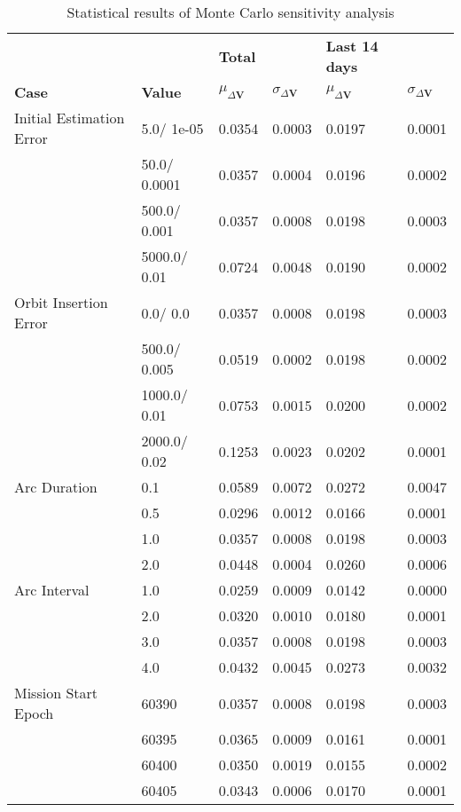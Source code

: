 \begin{table}[h!]
\centering
\begin{tabular}{llllll}
 &  & \cellcolor[HTML]{EFEFEF}\textbf{Total} &  & \cellcolor[HTML]{EFEFEF}\textbf{Last 14 days} &  \\
\rowcolor[HTML]{EFEFEF} 
\textbf{Case} & \textbf{Value} & \textbf{$\mu_{\Delta \boldsymbol{V}}$} & \textbf{$\sigma_{\Delta \boldsymbol{V}}$} & \textbf{$\mu_{\Delta \boldsymbol{V}}$} & \textbf{$\sigma_{\Delta \boldsymbol{V}}$} \\ 
Initial Estimation Error & 5.0/
1e-05 & 0.0354 & 0.0003 & 0.0197 & 0.0001 \\ 
 & 50.0/
0.0001 & 0.0357 & 0.0004 & 0.0196 & 0.0002 \\ 
 & 500.0/
0.001 & 0.0357 & 0.0008 & 0.0198 & 0.0003 \\ 
 & 5000.0/
0.01 & 0.0724 & 0.0048 & 0.0190 & 0.0002 \\ 
Orbit Insertion Error & 0.0/
0.0 & 0.0357 & 0.0008 & 0.0198 & 0.0003 \\ 
 & 500.0/
0.005 & 0.0519 & 0.0002 & 0.0198 & 0.0002 \\ 
 & 1000.0/
0.01 & 0.0753 & 0.0015 & 0.0200 & 0.0002 \\ 
 & 2000.0/
0.02 & 0.1253 & 0.0023 & 0.0202 & 0.0001 \\ 
Arc Duration & 0.1 & 0.0589 & 0.0072 & 0.0272 & 0.0047 \\ 
 & 0.5 & 0.0296 & 0.0012 & 0.0166 & 0.0001 \\ 
 & 1.0 & 0.0357 & 0.0008 & 0.0198 & 0.0003 \\ 
 & 2.0 & 0.0448 & 0.0004 & 0.0260 & 0.0006 \\ 
Arc Interval & 1.0 & 0.0259 & 0.0009 & 0.0142 & 0.0000 \\ 
 & 2.0 & 0.0320 & 0.0010 & 0.0180 & 0.0001 \\ 
 & 3.0 & 0.0357 & 0.0008 & 0.0198 & 0.0003 \\ 
 & 4.0 & 0.0432 & 0.0045 & 0.0273 & 0.0032 \\ 
Mission Start Epoch & 60390 & 0.0357 & 0.0008 & 0.0198 & 0.0003 \\ 
 & 60395 & 0.0365 & 0.0009 & 0.0161 & 0.0001 \\ 
 & 60400 & 0.0350 & 0.0019 & 0.0155 & 0.0002 \\ 
 & 60405 & 0.0343 & 0.0006 & 0.0170 & 0.0001 \\ 
\end{tabular}
\caption{Statistical results of Monte Carlo sensitivity analysis}
\label{tab:SensitivityAnalysis}
\end{table}